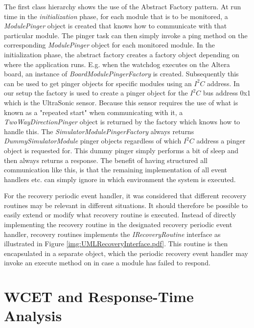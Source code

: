The first class hierarchy shows the use of the Abstract Factory pattern. At run time in the \emph{initialization} phase, for each module that is to be monitored, a \emph{ModulePinger} object is created that knows how to communicate with that particular module. The pinger task can then simply invoke a ping method on the corresponding \emph{ModulePinger} object for each monitored module. In the initialization phase, the abstract factory creates a factory object depending on where the application runs. E.g. when the watchdog executes on the Altera board, an instance of \emph{BoardModulePingerFactory} is created. Subsequently this can be used to get pinger objects for specific modules using an $\textit{I}^2\textit{C}$ address. In our setup the factory is used to create a pinger object for the $\textit{I}^2\textit{C}$ bus address 0x1 which is the UltraSonic sensor. Because this sensor requires the use of what is known as a "repeated start" when communicating with it, a \emph{TwoWayDirectionPinger} object is returned by the factory which knows how to handle this.
The \emph{SimulatorModulePingerFactory} always returns \emph{DummySimulatorModule} pinger objects regardless of which $\textit{I}^2\textit{C}$ address a pinger object is requested for. This dummy pinger simply performs a bit of sleep and then always returns a response. The benefit of having structured all communication like this, is that the remaining implementation of all event handlers etc. can simply ignore in which environment the system is executed.

For the recovery periodic event handler, it was considered that different recovery routines may be relevant in different situations. It should therefore be possible to easily extend or modify what recovery routine is executed. Instead of directly implementing the recovery routine in the designated recovery periodic event handler, recovery routines implements the \emph{IRecoveryRoutine} interface as illustrated in Figure \ref{img:UMLRecoveryInterface.pdf}. This routine is then encapsulated in a separate object, which the periodic recovery event handler may invoke an execute method on in case a module has failed to respond.

\chapter{WCET and Response-Time Analysis}
\label{chapter:wcetrta}
